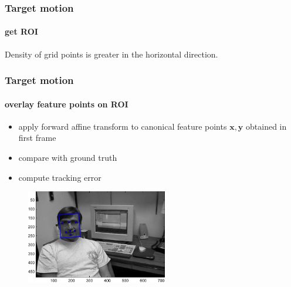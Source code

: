 \begin{frame}[plain]
\frametitle{Target motion}
\framesubtitle{get ROI}
\mypagenum
\begin{changemargin}{-1.3in}{0in}
Density of grid points is greater in the horizontal direction.
\begin{figure}[t]
\centering
{}
\end{figure}
\end{changemargin}
\end{frame}


\begin{frame}
\frametitle{Target motion}
\framesubtitle{overlay feature points on ROI}
\mypagenum
\begin{itemize}
\item apply forward affine transform to canonical feature points $\mathbf{x,y}$ obtained in first frame
\item compare with ground truth
\item compute tracking error
\end{itemize}
\begin{figure}[t]
\centering
\includegraphics[width=0.55\textwidth]{thesis/dataset_Dudek_with_feature_points_00001.pdf}
\label{Fig:overall}
\end{figure}
\end{frame}

